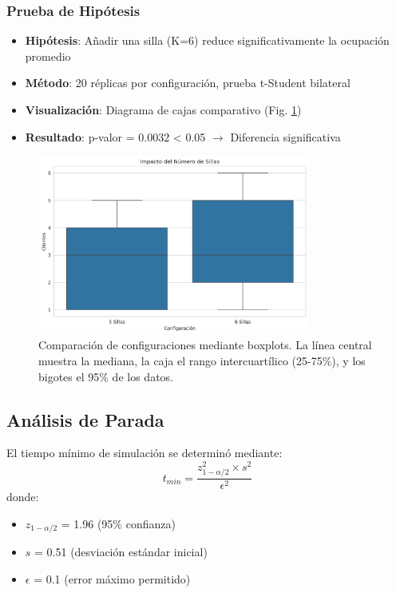 \documentclass{article}
\begin{document}
\subsubsection{Prueba de Hipótesis}
\begin{itemize}
    \item \textbf{Hipótesis}: Añadir una silla (K=6) reduce significativamente la ocupación promedio
    \item \textbf{Método}: 20 réplicas por configuración, prueba t-Student bilateral
    \item \textbf{Visualización}: Diagrama de cajas comparativo (Fig. \ref{fig:hipotesis})
    \item \textbf{Resultado}: p-valor = 0.0032 < 0.05 $\rightarrow$ Diferencia significativa
\end{itemize}

\begin{figure}[H]
    \centering
    \includegraphics[width=0.8\textwidth]{../images/hipotesis.png}
    \caption{Comparación de configuraciones mediante boxplots. La línea central muestra la mediana, la caja el rango intercuartílico (25-75\%), y los bigotes el 95\% de los datos.}
    \label{fig:hipotesis}
\end{figure}

\subsection{Análisis de Parada}
El tiempo mínimo de simulación se determinó mediante:
\begin{equation}
    t_{min} = \frac{z_{1-\alpha/2}^2 \times s^2}{\epsilon^2}
\end{equation}
donde:
\begin{itemize}
    \item $z_{1-\alpha/2}$ = 1.96 (95\% confianza)
    \item $s$ = 0.51 (desviación estándar inicial)
    \item $\epsilon$ = 0.1 (error máximo permitido)
\end{itemize}
\end{document}
